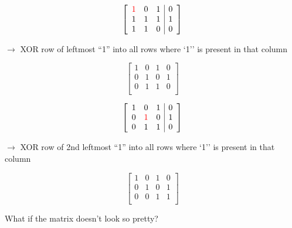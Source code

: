 \documentclass[aspectratio=196]{slides}
\begin{document}
\begin{minipage}{0.2\linewidth}
\[
\left[
\begin{array}{lll|l}
\color{red}{1} &            0 &           1 & 0\\
1 &            1 &           1 & 1\\
1 &            1 &           0 & 0\\
\end{array}
\right]
\]
\end{minipage}
\begin{minipage}{0.4\linewidth}
$\rightarrow$ XOR row of leftmost ``1'' into all rows where `1'' is present in that column
\end{minipage}
\begin{minipage}{0.2\linewidth}
\[
\left[
\begin{array}{lll|l}
1 &            0 &           1 & 0\\
0 &            1 &           0 & 1\\
0 &            1 &           1 & 0\\
\end{array}
\right]
\]
\end{minipage}

\begin{minipage}{0.2\linewidth}
\[
\left[
\begin{array}{lll|l}
1 &            0 &           1 & 0\\
0 &            \color{red}{1} &           0 & 1\\
0 &            1 &           1 & 0\\
\end{array}
\right]
\]
\end{minipage}
\begin{minipage}{0.4\linewidth}
$\rightarrow$ XOR row of 2nd  leftmost ``1'' into all rows where `1'' is present in that column
\end{minipage}
\begin{minipage}{0.2\linewidth}
\[
\left[
\begin{array}{lll|l}
1 &            0 &           1 & 0\\
0 &            1 &           0 & 1\\
0 &            0 &           1 & 1\\
\end{array}
\right]
\]
\end{minipage}

What if the matrix doesn't look so pretty?
\end{document}
